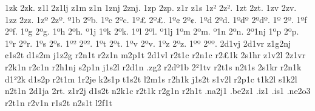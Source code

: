 {1zk
2zk.
z1l
2z1lj
z1m
z1n
1znj
2znj.
1zp
2zp.
z1r
z1s
1z^^b2
2z^^b2.
1zt
2zt.
1zv
2zv.
1zz
2zz.
1z^^ba
2z^^ba.
^^ba1b
2^^bab.
1^^bac
2^^bac.
1^^ba^^a3
2^^ba^^a3.
1^^ba^^a2
2^^ba^^a2.
1^^bad
2^^bad.
1^^bad^^ba
2^^bad^^ba.
1^^ba^^9e
2^^ba^^9e.
1^^baf
2^^baf.
1^^bag
2^^bag.
1^^bah
2^^bah.
^^ba1j
1^^bak
2^^bak.
1^^bal
2^^bal.
^^ba1lj
1^^bam
2^^bam.
^^ba1n
2^^ban.
2^^ba1nj
1^^bap
2^^bap.
1^^bar
2^^bar.
1^^bas
2^^bas.
1^^ba^^b2
2^^ba^^b2.
1^^bat
2^^bat.
1^^bav
2^^bav.
1^^baz
2^^baz.
1^^ba^^ba
2^^ba^^ba.
%
2d1vj
2d1vr
z1g2nj
^^a21s2t
d1s2m
j1z2g
r2n1t
r2z1n
m2p1t
2d1vl
r2t1c
r2n1c
r2^^a31k
2s1hr
z1v2l
2z1vr
r2k1n
r2c1n
r2h1nj
s2p1n
j1s2l
r2d1n
.zg2
r2d^^ba1b
2^^b21tv
r2t1s
n2t1s
2s1kr
r2n1k
d1^^b22k
d1s2p
r2t1m
1r2je
k2s1p
t1s2t
l2m1s
r2h1k
j1s2t
s1v2l
r2p1c
t1k2l
s1k2l
n2t1n
2d1ja
2rt.
z1r2j
d1s2t
n2k1c
r2t1k
r2g1n
r2h1t
.na2j1
.be2z1
.iz1
.is1
.ne2o3
r2t1n
r2v1n
r1s2t
n2s1t
l2f1t
}
